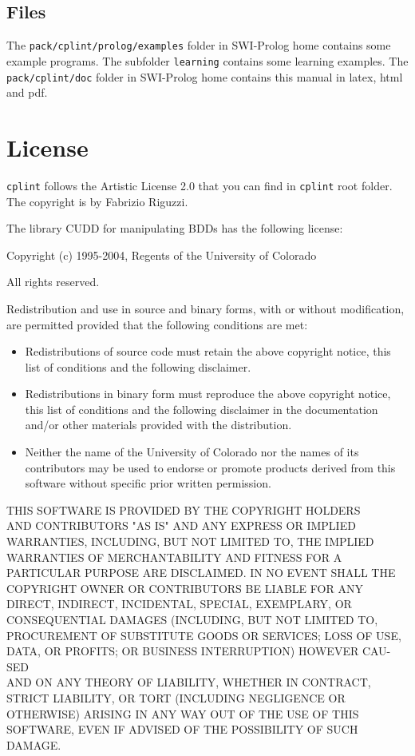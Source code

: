 \documentclass[a4paper,10pt]{article}
\newcommand{\href}[2]{\Link[#1]{}{} #2 \EndLink}
\begin{document}
\subsection{Files}
The \texttt{pack/cplint/prolog/examples} folder in SWI-Prolog home contains some example programs. The subfolder \texttt{learning} contains some learning examples.
The \texttt{pack/cplint/doc} folder in SWI-Prolog home contains this manual in latex, html and pdf.


\section{License}
\label{license}



\texttt{cplint} follows the Artistic License 2.0 that you can find in \texttt{cplint} root folder. The copyright is by Fabrizio Riguzzi.
\vspace{3mm}


The library \href{http://vlsi.colorado.edu/\string ~fabio/}{CUDD} for manipulating BDDs has the following license:

\vspace{3mm}

Copyright (c) 1995-2004, Regents of the University of Colorado

All rights reserved.

Redistribution and use in source and binary forms, with or without
modification, are permitted provided that the following conditions
are met:

\begin{itemize}
\item
Redistributions of source code must retain the above copyright
notice, this list of conditions and the following disclaimer.
\item
Redistributions in binary form must reproduce the above copyright
notice, this list of conditions and the following disclaimer in the
documentation and/or other materials provided with the distribution.
\item
Neither the name of the University of Colorado nor the names of its
contributors may be used to endorse or promote products derived from
this software without specific prior written permission.
\end{itemize}
THIS SOFTWARE IS PROVIDED BY THE COPYRIGHT HOLDERS \\ AND CONTRIBUTORS
"AS IS" AND ANY EXPRESS OR IMPLIED WARRANTIES, INCLUDING, BUT NOT
LIMITED TO, THE IMPLIED WARRANTIES OF MERCHANTABILITY AND FITNESS
FOR A PARTICULAR PURPOSE ARE DISCLAIMED. IN NO EVENT SHALL THE
COPYRIGHT OWNER OR CONTRIBUTORS BE LIABLE FOR ANY DIRECT, INDIRECT,
INCIDENTAL, SPECIAL, EXEMPLARY, OR CONSEQUENTIAL DAMAGES (INCLUDING,
BUT NOT LIMITED TO, PROCUREMENT OF SUBSTITUTE GOODS OR SERVICES;
LOSS OF USE, DATA, OR PROFITS; OR BUSINESS INTERRUPTION) HOWEVER
CAU-SED
\\ AND ON ANY THEORY OF LIABILITY, WHETHER IN CONTRACT, STRICT
LIABILITY, OR TORT (INCLUDING NEGLIGENCE OR OTHERWISE) ARISING IN
ANY WAY OUT OF THE USE OF THIS SOFTWARE, EVEN IF ADVISED OF THE
POSSIBILITY OF SUCH DAMAGE.




\end{document}
